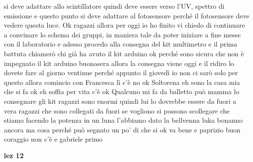 si deve adattare allo scintillatore quindi deve essere verso l'UV, spettro di emissione e questo punto si deve adattare al fotosensore perché il fotosensore deve vedere questa luce. Ok ragazzi allora per oggi io ho finito vi chiedo di continuare a convinare lo schema dei gruppi, in maniera tale da poter iniziare a fine messe con il laboratorio e adesso procedo alla consegna del kit multimetro e il prima battuta chiamerò chi già ha avuto il kit arduino ok perché sono sicura che non è impegnato il kit arduino buonasera allora la consegna viene oggi e il ridiro lo dovete fare al giorno ventinue perché appunto il giovedì io non ci sarò solo per questo allora comincio con Francesca lì c'è no ok Soltorena eh sono la casa mia che si fa ok eh soffia per vita c'è ok Qualcuno mi fa da balletto può mamma lo consegnare gli kit ragazzi sono enormi quindi lui lo dovrebbe essere da fuori a vera ragazzi che sono collegati da fuori se vogliono si possono scollegare che stiamo facendo la potenza in un luna l'abbiamo dato la bellvenna luka bonanno ancora ma cosa perché può segnato un po' di che si ok va bene e paprizio buon coraggio non c'è e gabriele primo


\textbf{lez 12}


